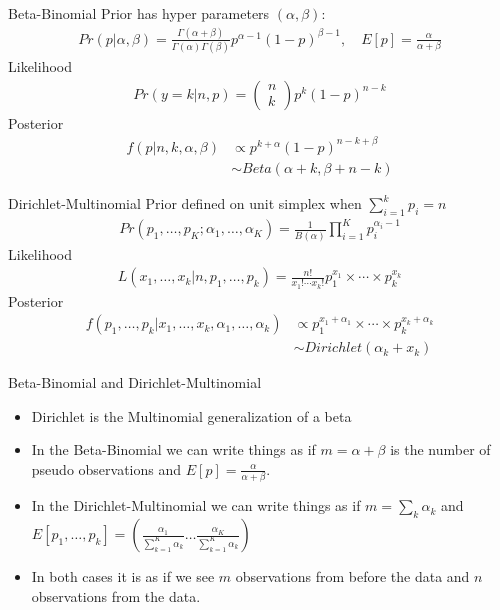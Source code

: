 \documentclass[aspectratio=169]{beamer}
\begin{document}
\begin{frame}{Beta-Binomial}
Prior has \alert{hyper parameters} $(\alpha,\beta)$:
\begin{align*}
Pr(p | \alpha, \beta)=\frac{\Gamma(\alpha+\beta)}{\Gamma(\alpha) \Gamma(\beta)} p^{\alpha-1}(1-p)^{\beta-1} ,\quad E[p] = \frac{\alpha}{\alpha+\beta}
\end{align*}
Likelihood
\begin{align*}
Pr(y=k| n, p) = \left( \begin{array}{l}{n} \\ {k}\end{array}\right) p^{k}(1-p)^{n-k}
\end{align*}
Posterior
\begin{align*}
f(p | n,k, \alpha,\beta) &\propto  p^{k+\alpha}(1-p)^{n-k+ \beta} \\
&\sim Beta(\alpha + k, \beta + n-k)
\end{align*}
\end{frame}


\begin{frame}{Dirichlet-Multinomial}
Prior defined on \alert{unit simplex} when $ \sum_{i=1}^{k} p_{i}=n$
\begin{align*}
Pr \left(p_{1}, \ldots, p_{K} ; \alpha_{1}, \ldots, \alpha_{K}\right)=\frac{1}{B(\alpha)} \prod_{i=1}^{K} p_{i}^{\alpha_{i}-1}\end{align*}
Likelihood
\begin{align*}
L(x_1,\ldots,x_k | n, p_1,\ldots,p_k) = \frac{n !}{x_{1} ! \cdots x_{k} !} p_{1}^{x_{1}} \times \cdots \times p_{k}^{x_{k}}
\end{align*}
Posterior
\begin{align*}
f( p_1,\ldots,p_k | x_1,\ldots,x_k , \alpha_1,\ldots,\alpha_k) &\propto p_{1}^{x_{1} +\alpha_1} \times \cdots \times p_{k}^{x_{k} +\alpha_k} \\
&\sim Dirichlet(\alpha_k + x_k)
\end{align*}
\end{frame}


\begin{frame}{Beta-Binomial and Dirichlet-Multinomial}
\begin{itemize}
\item Dirichlet is the Multinomial generalization of a beta
\item In the Beta-Binomial we can write things as if $m=\alpha + \beta$ is the number of \alert{pseudo observations}  and $E[p] = \frac{\alpha}{\alpha+\beta}$.
\item In the Dirichlet-Multinomial we can write things as if $m = \sum_{k} \alpha_k$ and $E[p_1,\ldots,p_k] =  \left( \frac{\alpha_1}{\sum_{k=1}^K \alpha_k} \ldots \frac{\alpha_K}{\sum_{k=1}^K \alpha_k} \right)$
\item In both cases it is as if we see $m$ observations from before the data and $n$ observations from the data.
\end{itemize}
\end{frame}
\end{document}
